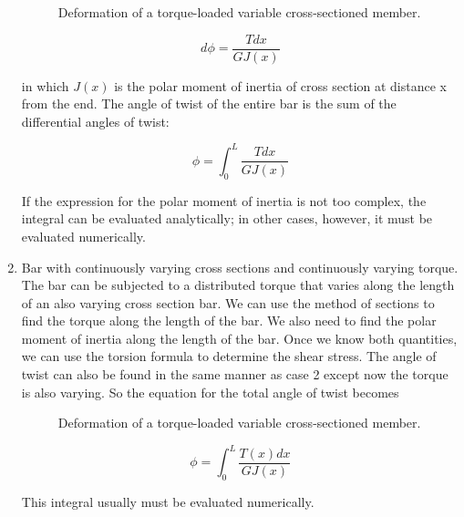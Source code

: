 \documentclass[
fontsize=10pt,
a4paper,
twosides=false,
open=any,
svgnames,
]{kaobook} %
\begin{document}
\begin{enumerate}
  \begin{figure}[h]
    \centering
    \caption{Deformation of a torque-loaded variable cross-sectioned member.}
  \end{figure}
  
  \[d\phi  = \frac{{Tdx}}{{G{J}(x)}}\]
  
  in which $J(x)$ is the polar moment of inertia of cross section at distance x from the end. The angle of twist of the entire bar is the sum of the differential angles of twist:
  
  \begin{equation}
    \phi  = \int_0^L \frac{Tdx}{G{J(x)}}
  \end{equation}
  
  If the expression for the polar moment of inertia is not too complex, the integral can be evaluated analytically; in other cases, however, it must be evaluated numerically.
  
\item Bar with continuously varying cross sections and continuously varying torque. The bar can be subjected to a distributed torque that varies along the length of an also varying cross section bar. We can use the method of sections to find the torque along the length of the bar. We also need to find the polar moment of inertia along the length of the bar. Once we know both quantities, we can use the torsion formula to determine the shear stress. The angle of twist can also be found in the same manner as case 2 except now the torque is also varying. So the equation for the total angle of twist becomes

    \begin{figure}[h]
    \centering
    \caption{Deformation of a torque-loaded variable cross-sectioned member.}
  \end{figure}
  
  \begin{equation}
    \phi  = \int_0^L \frac{T(x)dx}{G{J(x)}}
  \end{equation}
  
  This integral usually must be evaluated numerically.
\end{enumerate}
  
\end{document}
